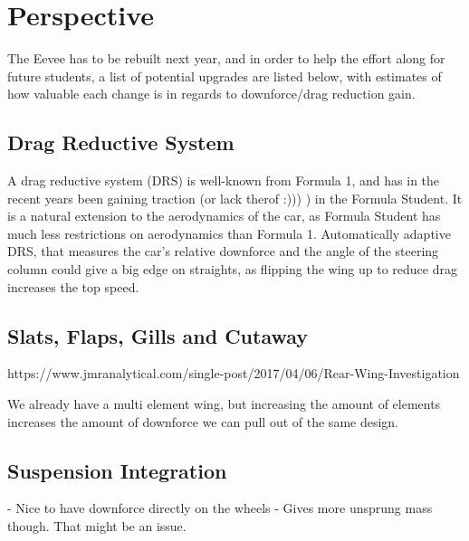 \chapter*{Perspective}
\label{chap:perspective}

The Eevee has to be rebuilt next year, and in order to help the effort along for future students, a list of potential upgrades are listed below, with estimates of how valuable each change is in regards to downforce/drag reduction gain.

\section{Drag Reductive System}

A drag reductive system (DRS) is well-known from Formula 1, and has in the recent years been gaining traction (or lack therof :))) ) in the Formula Student. It is a natural extension to the aerodynamics of the car, as Formula Student has much less restrictions on aerodynamics than Formula 1. Automatically adaptive DRS, that measures the car's relative downforce and the angle of the steering column could give a big edge on straights, as flipping the wing up to reduce drag increases the top speed.

\section{Slats, Flaps, Gills and Cutaway}

https://www.jmranalytical.com/single-post/2017/04/06/Rear-Wing-Investigation

We already have a multi element wing, but increasing the amount of elements increases the amount of downforce we can pull out of the same design.

\section{Suspension Integration}

- Nice to have downforce directly on the wheels
- Gives more unsprung mass though. That might be an issue.
